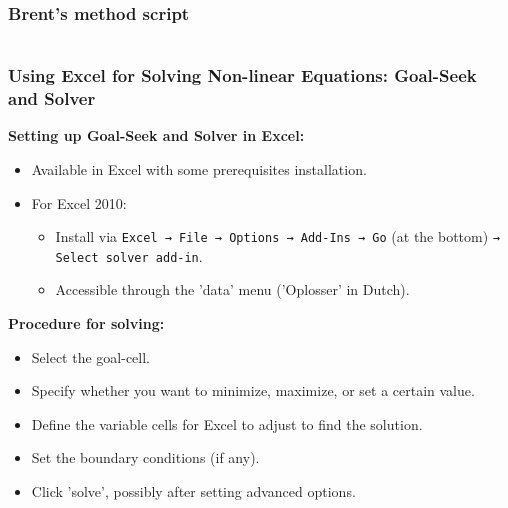 \begin{frame}[fragile]
  \frametitle{Brent's method script}
  \begin{columns}
    
    
  \end{columns}
\end{frame}



\begin{frame}[fragile]
  \frametitle{Using Excel for Solving Non-linear Equations: Goal-Seek and Solver}

  \textbf{Setting up Goal-Seek and Solver in Excel:}
  \begin{itemize}
    \item Available in Excel with some prerequisites installation.
    \item For Excel 2010:
          \begin{itemize}
            \item Install via \texttt{Excel → File → Options → Add-Ins → Go} (at the bottom) \texttt{→ Select solver add-in}.
            \item Accessible through the 'data' menu ('Oplosser' in Dutch).
          \end{itemize}
  \end{itemize}

  \textbf{Procedure for solving:}
  \begin{itemize}
    \item Select the goal-cell.
    \item Specify whether you want to minimize, maximize, or set a certain value.
    \item Define the variable cells for Excel to adjust to find the solution.
    \item Set the boundary conditions (if any).
    \item Click 'solve', possibly after setting advanced options.
  \end{itemize}
\end{frame}


